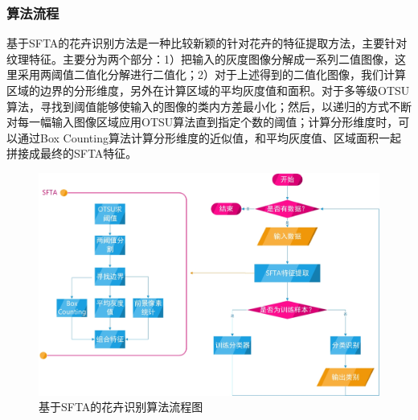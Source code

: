 \documentclass[supercite]{HustGraduPaper}
\begin{document}
\begin{sloppypar}
  \subsubsection{算法流程}
  基于SFTA的花卉识别方法是一种比较新颖的针对花卉的特征提取方法，主要针对纹理特征。主要分为两个部分：1）把输入的灰度图像分解成一系列二值图像，这里采用两阈值二值化分解进行二值化；2）对于上述得到的二值化图像，我们计算区域的边界的分形维度，另外在计算区域的平均灰度值和面积。对于多等级OTSU算法，寻找到阈值能够使输入的图像的类内方差最小化；然后，以递归的方式不断对每一幅输入图像区域应用OTSU算法直到指定个数的阈值；计算分形维度时，可以通过Box Counting算法计算分形维度的近似值，和平均灰度值、区域面积一起拼接成最终的SFTA特征。\begin{figure}[H]
    \setlength{\abovecaptionskip}{0.2cm}
    \setlength{\belowcaptionskip}{-0.cm}
      \centering%
      \includegraphics[scale=0.5]{25.jpg}
      \caption{基于SFTA的花卉识别算法流程图}
    \end{figure}

\end{sloppypar}
\end{document}

